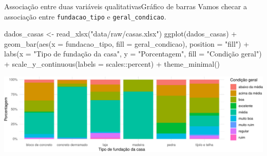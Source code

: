 \documentclass[
  10pt,
  ignorenonframetext,
]{beamer}
\newenvironment{Shaded}{}{}
\newcommand{\DataTypeTok}[1]{#1}
\newcommand{\KeywordTok}[1]{\textcolor[rgb]{0.00,0.00,1.00}{#1}}
\newcommand{\NormalTok}[1]{#1}
\newcommand{\OperatorTok}[1]{#1}
\newcommand{\StringTok}[1]{\textcolor[rgb]{0.00,0.50,0.50}{#1}}
\begin{document}
\begin{frame}[fragile]{Associação entre duas variáveis
qualitativas\newline Gráfico de barras}
\protect\hypertarget{associauxe7uxe3o-entre-duas-variuxe1veis-qualitativasgruxe1fico-de-barras}{}
Vamos checar a associação entre \texttt{fundacao\_tipo} e
\texttt{geral\_condicao}.

\small

\begin{Shaded}
\begin{Highlighting}[]
\NormalTok{dados\_casas \textless{}{-}}\StringTok{ }\KeywordTok{read\_xlsx}\NormalTok{(}\StringTok{"data/raw/casas.xlsx"}\NormalTok{)}
\KeywordTok{ggplot}\NormalTok{(dados\_casas) }\OperatorTok{+}
\StringTok{  }\KeywordTok{geom\_bar}\NormalTok{(}\KeywordTok{aes}\NormalTok{(}\DataTypeTok{x =}\NormalTok{ fundacao\_tipo, }\DataTypeTok{fill =}\NormalTok{ geral\_condicao),}
          \DataTypeTok{position =} \StringTok{"fill"}\NormalTok{) }\OperatorTok{+}
\StringTok{  }\KeywordTok{labs}\NormalTok{(}\DataTypeTok{x =} \StringTok{"Tipo de fundação da casa"}\NormalTok{, }\DataTypeTok{y =} \StringTok{"Porcentagem"}\NormalTok{,}
      \DataTypeTok{fill =} \StringTok{"Condição geral"}\NormalTok{) }\OperatorTok{+}
\StringTok{  }\KeywordTok{scale\_y\_continuous}\NormalTok{(}\DataTypeTok{labels =}\NormalTok{ scales}\OperatorTok{::}\NormalTok{percent) }\OperatorTok{+}
\StringTok{  }\KeywordTok{theme\_minimal}\NormalTok{()}
\end{Highlighting}
\end{Shaded}

\normalsize
\end{frame}

\begin{frame}
\begin{center}\includegraphics[width=1\linewidth]{aulas_files/figure-beamer/unnamed-chunk-75-1} \end{center}
\end{frame}
\end{document}
